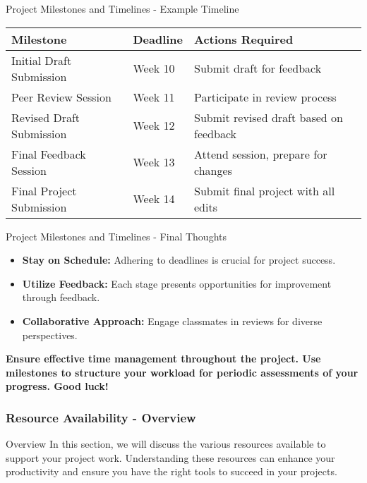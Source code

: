 \documentclass[aspectratio=169]{beamer}
\begin{document}
\begin{frame}[fragile]{Project Milestones and Timelines - Example Timeline}
    \begin{table}[ht]
        \centering
        \begin{tabular}{|l|l|l|}
            \hline
            \textbf{Milestone} & \textbf{Deadline} & \textbf{Actions Required} \\
            \hline
            Initial Draft Submission & Week 10 & Submit draft for feedback \\
            \hline
            Peer Review Session & Week 11 & Participate in review process \\
            \hline
            Revised Draft Submission & Week 12 & Submit revised draft based on feedback \\
            \hline
            Final Feedback Session & Week 13 & Attend session, prepare for changes \\
            \hline
            Final Project Submission & Week 14 & Submit final project with all edits \\
            \hline
        \end{tabular}
    \end{table}
\end{frame}

\begin{frame}[fragile]{Project Milestones and Timelines - Final Thoughts}
    \begin{itemize}
        \item \textbf{Stay on Schedule:} Adhering to deadlines is crucial for project success.
        \item \textbf{Utilize Feedback:} Each stage presents opportunities for improvement through feedback.
        \item \textbf{Collaborative Approach:} Engage classmates in reviews for diverse perspectives.
    \end{itemize}

    \textbf{Ensure effective time management throughout the project. Use milestones to structure your workload for periodic assessments of your progress. Good luck!}
\end{frame}

\begin{frame}[fragile]
    \frametitle{Resource Availability - Overview}
    \begin{block}{Overview}
        In this section, we will discuss the various resources available to support your project work. Understanding these resources can enhance your productivity and ensure you have the right tools to succeed in your projects.
    \end{block}
\end{frame}
\end{document}
